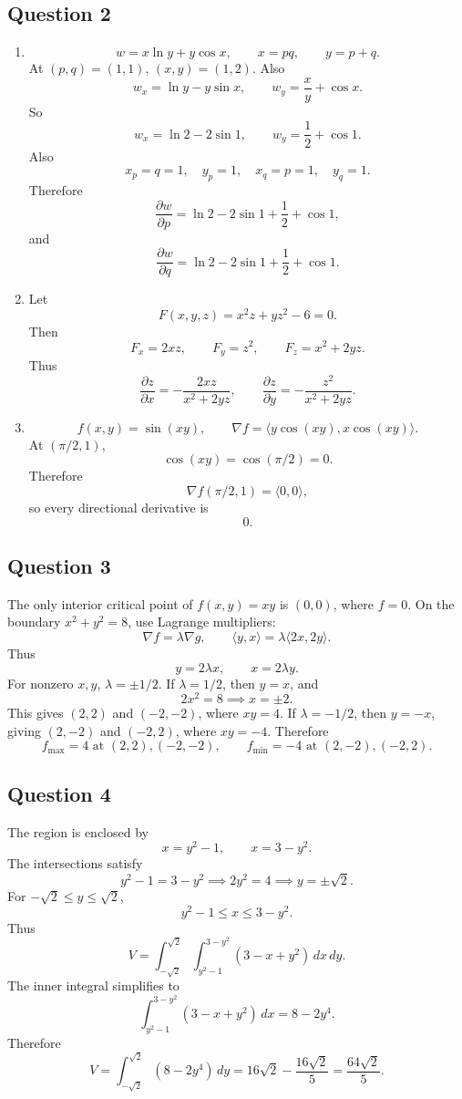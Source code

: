 \documentclass[11pt]{article}
\begin{document}
\subsection*{Question 2}
\begin{enumerate}[label=\alph*)]
\item
\[
w=x\ln y+y\cos x,\qquad x=pq,\qquad y=p+q.
\]
At $(p,q)=(1,1)$, $(x,y)=(1,2)$. Also
\[
w_x=\ln y-y\sin x,\qquad w_y=\frac{x}{y}+\cos x.
\]
So
\[
w_x=\ln2-2\sin1,\qquad w_y=\frac12+\cos1.
\]
Also
\[
x_p=q=1,\quad y_p=1,\quad x_q=p=1,\quad y_q=1.
\]
Therefore
\[
\boxed{\frac{\partial w}{\partial p}
=\ln2-2\sin1+\frac12+\cos1},
\]
and
\[
\boxed{\frac{\partial w}{\partial q}
=\ln2-2\sin1+\frac12+\cos1}.
\]

\item
Let
\[
F(x,y,z)=x^2z+yz^2-6=0.
\]
Then
\[
F_x=2xz,\qquad F_y=z^2,\qquad F_z=x^2+2yz.
\]
Thus
\[
\boxed{\frac{\partial z}{\partial x}=-\frac{2xz}{x^2+2yz}},
\qquad
\boxed{\frac{\partial z}{\partial y}=-\frac{z^2}{x^2+2yz}}.
\]

\item
\[
f(x,y)=\sin(xy),\qquad
\nabla f=\langle y\cos(xy),x\cos(xy)\rangle.
\]
At $(\pi/2,1)$,
\[
\cos(xy)=\cos(\pi/2)=0.
\]
Therefore
\[
\nabla f(\pi/2,1)=\langle 0,0\rangle,
\]
so every directional derivative is
\[
\boxed{0}.
\]
\end{enumerate}

\subsection*{Question 3}
The only interior critical point of $f(x,y)=xy$ is $(0,0)$, where $f=0$.
On the boundary $x^2+y^2=8$, use Lagrange multipliers:
\[
\nabla f=\lambda\nabla g,
\qquad
\langle y,x\rangle=\lambda\langle 2x,2y\rangle.
\]
Thus
\[
y=2\lambda x,\qquad x=2\lambda y.
\]
For nonzero $x,y$, $\lambda=\pm1/2$.
If $\lambda=1/2$, then $y=x$, and
\[
2x^2=8 \implies x=\pm2.
\]
This gives $(2,2)$ and $(-2,-2)$, where $xy=4$.
If $\lambda=-1/2$, then $y=-x$, giving $(2,-2)$ and $(-2,2)$, where $xy=-4$.
Therefore
\[
\boxed{f_{\max}=4\text{ at }(2,2),(-2,-2)},
\qquad
\boxed{f_{\min}=-4\text{ at }(2,-2),(-2,2)}.
\]

\subsection*{Question 4}
The region is enclosed by
\[
x=y^2-1,\qquad x=3-y^2.
\]
The intersections satisfy
\[
y^2-1=3-y^2
\implies
2y^2=4
\implies
y=\pm\sqrt2.
\]
For $-\sqrt2\le y\le\sqrt2$,
\[
y^2-1\le x\le 3-y^2.
\]
Thus
\[
V=\int_{-\sqrt2}^{\sqrt2}\int_{y^2-1}^{3-y^2}(3-x+y^2)\,dx\,dy.
\]
The inner integral simplifies to
\[
\int_{y^2-1}^{3-y^2}(3-x+y^2)\,dx=8-2y^4.
\]
Therefore
\[
V=\int_{-\sqrt2}^{\sqrt2}(8-2y^4)\,dy
=16\sqrt2-\frac{16\sqrt2}{5}
=\boxed{\frac{64\sqrt2}{5}}.
\]
\end{document}

